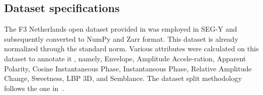 \documentclass[conference]{IEEEtran}
\def\lbp{LBP 3D\xspace}
\begin{document}
\subsection{Dataset specifications} %
The F3 Netherlands open dataset provided in \cite{alaudah2019machine} was employed in SEG-Y and subsequently converted to NumPy and Zarr format. 
This dataset is already normalized through the standard norm.
Various attributes were calculated on this dataset to annotate it%
, namely, 
     Envelope,
     Amplitude Accele-ration,
     Apparent Polarity,
     Cosine Instantaneous Phase,
     Instantaneous Phase,
     Relative Amplitude Change,
     Sweetness,
     \lbp, and
     Semblance. 
     The dataset split methodology follows the one in~\cite{alaudah2019machine}.
\end{document}
